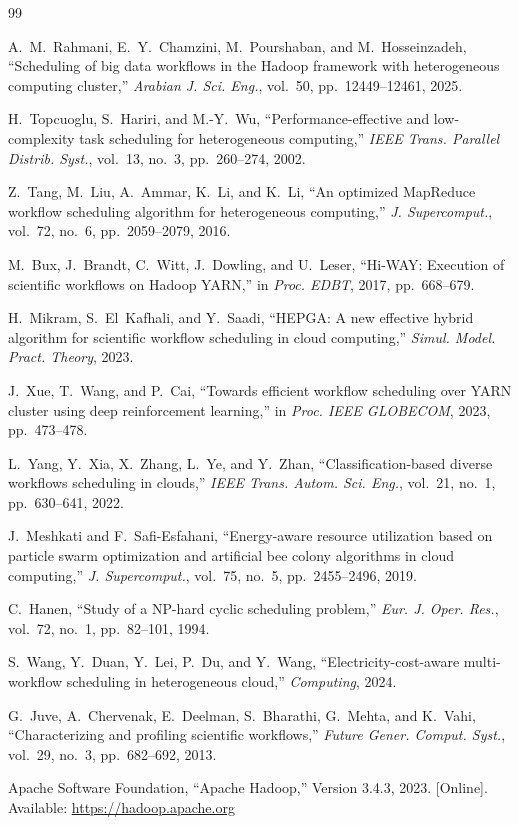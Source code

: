 \documentclass[10pt,twocolumn]{article}
\begin{document}
\begin{thebibliography}{99}

A.~M.~Rahmani, E.~Y.~Chamzini, M.~Pourshaban, and M.~Hosseinzadeh,
``Scheduling of big data workflows in the Hadoop framework with heterogeneous
computing cluster,'' \textit{Arabian J. Sci. Eng.}, vol.~50, pp.~12449--12461,
2025.

H.~Topcuoglu, S.~Hariri, and M.-Y.~Wu,
``Performance-effective and low-complexity task scheduling for heterogeneous
computing,'' \textit{IEEE Trans. Parallel Distrib. Syst.}, vol.~13, no.~3,
pp.~260--274, 2002.

Z.~Tang, M.~Liu, A.~Ammar, K.~Li, and K.~Li,
``An optimized MapReduce workflow scheduling algorithm for heterogeneous
computing,'' \textit{J. Supercomput.}, vol.~72, no.~6, pp.~2059--2079, 2016.

M.~Bux, J.~Brandt, C.~Witt, J.~Dowling, and U.~Leser,
``Hi-WAY: Execution of scientific workflows on Hadoop YARN,''
in \textit{Proc. EDBT}, 2017, pp.~668--679.

H.~Mikram, S.~El~Kafhali, and Y.~Saadi,
``HEPGA: A new effective hybrid algorithm for scientific workflow scheduling in
cloud computing,'' \textit{Simul. Model. Pract. Theory}, 2023.

J.~Xue, T.~Wang, and P.~Cai,
``Towards efficient workflow scheduling over YARN cluster using deep reinforcement
learning,'' in \textit{Proc. IEEE GLOBECOM}, 2023, pp.~473--478.

L.~Yang, Y.~Xia, X.~Zhang, L.~Ye, and Y.~Zhan,
``Classification-based diverse workflows scheduling in clouds,''
\textit{IEEE Trans. Autom. Sci. Eng.}, vol.~21, no.~1, pp.~630--641, 2022.

J.~Meshkati and F.~Safi-Esfahani,
``Energy-aware resource utilization based on particle swarm optimization and
artificial bee colony algorithms in cloud computing,''
\textit{J. Supercomput.}, vol.~75, no.~5, pp.~2455--2496, 2019.

C.~Hanen,
``Study of a NP-hard cyclic scheduling problem,''
\textit{Eur. J. Oper. Res.}, vol.~72, no.~1, pp.~82--101, 1994.

S.~Wang, Y.~Duan, Y.~Lei, P.~Du, and Y.~Wang,
``Electricity-cost-aware multi-workflow scheduling in heterogeneous cloud,''
\textit{Computing}, 2024.

G.~Juve, A.~Chervenak, E.~Deelman, S.~Bharathi, G.~Mehta, and K.~Vahi,
``Characterizing and profiling scientific workflows,''
\textit{Future Gener. Comput. Syst.}, vol.~29, no.~3, pp.~682--692, 2013.

Apache Software Foundation,
``Apache Hadoop,'' Version 3.4.3, 2023. [Online].
Available: \url{https://hadoop.apache.org}

\end{thebibliography}
\end{document}
